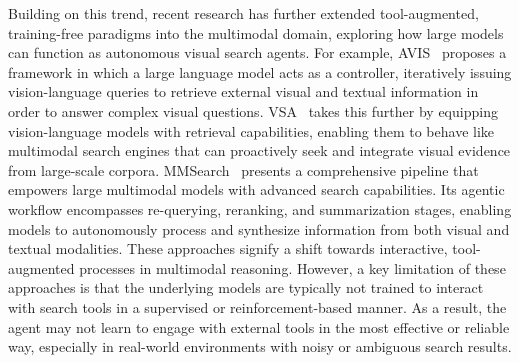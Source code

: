 \documentclass{article}
\begin{document}
Building on this trend, recent research has further extended tool-augmented, training-free paradigms into the multimodal domain, exploring how large models can function as autonomous visual search agents. For example, AVIS~\cite{vision-rag/avis} proposes a framework in which a large language model acts as a controller, iteratively issuing vision-language queries to retrieve external visual and textual information in order to answer complex visual questions. VSA~\cite{vision-rag/vsa} takes this further by equipping vision-language models with retrieval capabilities, enabling them to behave like multimodal search engines that can proactively seek and integrate visual evidence from large-scale corpora. MMSearch~\cite{vision-rag/mmsearch} presents a comprehensive pipeline that empowers large multimodal models with advanced search capabilities. Its agentic workflow encompasses re-querying, reranking, and summarization stages, enabling models to autonomously process and synthesize information from both visual and textual modalities. These approaches signify a shift towards interactive, tool-augmented processes in multimodal reasoning. However, a key limitation of these approaches is that the underlying models are typically not trained to interact with search tools in a supervised or reinforcement-based manner. As a result, the agent may not learn to engage with external tools in the most effective or reliable way, especially in real-world environments with noisy or ambiguous search results.
\end{document}
